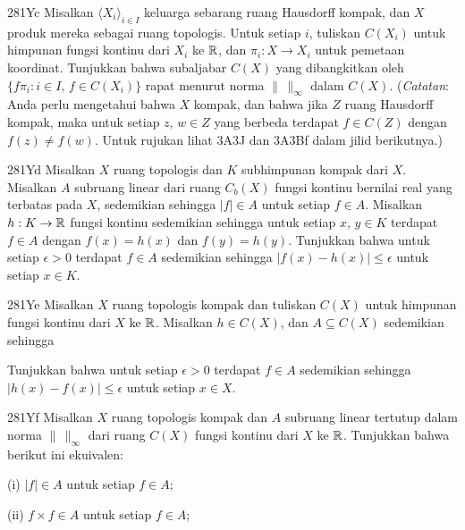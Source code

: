 {\spheader 281Yc Misalkan $\langle X_i\rangle_{i\in I}$ keluarga sebarang
ruang Hausdorff kompak, dan $X$ produk mereka sebagai ruang topologis. Untuk
setiap $i$, tuliskan $C(X_i)$ untuk himpunan fungsi kontinu dari $X_i$ ke
$\Bbb R$, dan $\pi_i:X\to X_i$ untuk pemetaan koordinat. Tunjukkan bahwa
subaljabar $C(X)$ yang dibangkitkan oleh
$\{f\pi_i:i\in I,\,f\in C(X_i)\}$ rapat menurut norma $\|\,\|_{\infty}$
dalam $C(X)$. ({\it Catatan\/}: Anda perlu mengetahui bahwa $X$ kompak,
 dan bahwa jika $Z$ ruang Hausdorff kompak, maka untuk setiap $z$, $w\in Z$ yang berbeda
terdapat $f\in C(Z)$ dengan $f(z)\ne f(w)$. Untuk rujukan lihat
3A3J dan 3A3Bf dalam jilid berikutnya.)
      
\spheader 281Yd Misalkan $X$ ruang topologis dan $K$ subhimpunan kompak dari
$X$. Misalkan $A$ subruang linear dari ruang $C_b(X)$ fungsi kontinu bernilai
real yang terbatas pada $X$, sedemikian sehingga $|f|\in A$ untuk setiap
$f\in A$. Misalkan $h:K\to\Bbb R$ fungsi kontinu sedemikian sehingga untuk
setiap $x$, $y\in K$ terdapat $f\in A$ dengan $f(x)=h(x)$ dan $f(y)=h(y)$.
Tunjukkan bahwa untuk setiap $\epsilon>0$ terdapat $f\in A$ sedemikian
sehingga $|f(x)-h(x)|\le\epsilon$ untuk setiap $x\in K$.
      
\spheader 281Ye Misalkan $X$ ruang topologis kompak dan tuliskan $C(X)$ untuk
himpunan fungsi kontinu dari $X$ ke $\Bbb R$. Misalkan $h\in C(X)$, dan
$A\subseteq C(X)$ sedemikian sehingga
      
      
      
      
\noindent Tunjukkan bahwa untuk setiap $\epsilon>0$ terdapat $f\in A$
sedemikian sehingga $|h(x)-f(x)|\le\epsilon$ untuk setiap $x\in X$.
      
\spheader 281Yf Misalkan $X$ ruang topologis kompak dan $A$ subruang linear
tertutup dalam norma $\|\,\|_{\infty}$ dari ruang $C(X)$ fungsi kontinu dari
$X$ ke $\Bbb R$. Tunjukkan bahwa berikut ini ekuivalen:
      
\quad (i) $|f|\in A$ untuk setiap $f\in A$;
      
\quad (ii) $f\times f\in A$ untuk setiap $f\in A$;
      
}
